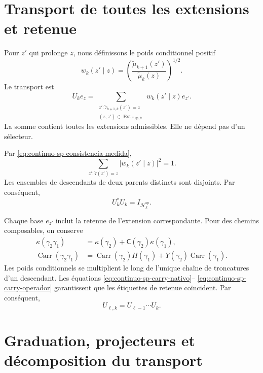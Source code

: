 \section{Transport de toutes les extensions et retenue}

Pour \(z'\) qui prolonge \(z\), nous définissons le poids conditionnel positif
\begin{equation}
\label{eq:continuo-sp-peso-condicional}
 w_k(z'\mid z)
 =\left(\frac{\widetilde\mu_{k+1}(z')}
               {\widetilde\mu_k(z)}\right)^{1/2}.
\end{equation}
Le transport est
\begin{equation}
\label{eq:continuo-sp-u-accion}
 U_ke_z
 =\sum_{\substack{z':\widetilde\tau_{k+1,k}(z')=z\\
            (z,z')\in\operatorname{Ext}_{\Gamma,\mathrm{sp},k}}}
 w_k(z'\mid z)e_{z'}.
\end{equation}
La somme contient toutes les extensions admissibles. Elle ne dépend pas d'un sélecteur.

Par \eqref{eq:continuo-sp-consistencia-medida},
\[
 \sum_{z':\widetilde\tau(z')=z}|w_k(z'\mid z)|^2=1.
\]
Les ensembles de descendants de deux parents distincts sont disjoints. Par
conséquent,
\begin{equation}
\label{eq:continuo-sp-u-isometria}
 U_k^*U_k=I_{\mathcal H_k^{\mathrm{sp}}}.
\end{equation}

Chaque base \(e_{z'}\) inclut la retenue de l'extension correspondante. Pour
des chemins composables, on conserve
\begin{align}
 \kappa(\gamma_2\gamma_1)
 &=\kappa(\gamma_2)+
   \mathsf C(\gamma_2)\kappa(\gamma_1),
 \label{eq:continuo-sp-carry-nativo}\\
 \operatorname{Carr}(\gamma_2\gamma_1)
 &=\operatorname{Carr}(\gamma_2)H(\gamma_1)
  +Y(\gamma_2)\operatorname{Carr}(\gamma_1).
 \label{eq:continuo-sp-carry-operador}
\end{align}
Les poids conditionnels se multiplient le long de l'unique chaîne de
troncatures d'un descendant. Les équations
\eqref{eq:continuo-sp-carry-nativo}--
\eqref{eq:continuo-sp-carry-operador} garantissent que les étiquettes de retenue
coïncident. Par conséquent,
\begin{equation}
\label{eq:continuo-sp-u-composicion}
 U_{\ell,k}=U_{\ell-1}\cdots U_k.
\end{equation}

\section{Graduation, projecteurs et décomposition du transport}

